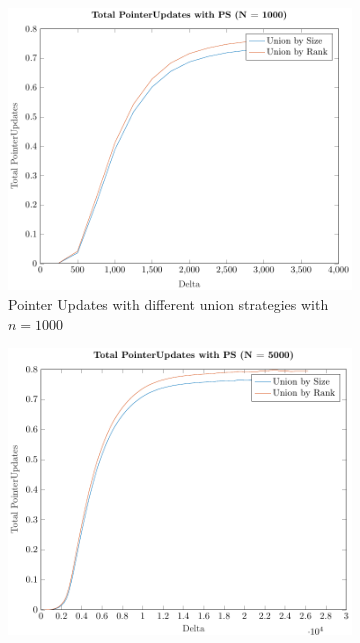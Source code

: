 \begin{figure}[ht]
    \centering
    \begin{subfigure}{0.32\textwidth}
        \centering
        \includegraphics[width=\textwidth]{../images/plotPSNonFull1000_PointerUpdates.pdf}
        \caption{Pointer Updates with different union strategies with $n = 1000$}
    \end{subfigure}%
    \hfill
    \begin{subfigure}{0.32\textwidth}
        \centering
        \includegraphics[width=\textwidth]{../images/plotPSNonFull5000_PointerUpdates.pdf}

\end{subfigure}
\end{figure}
